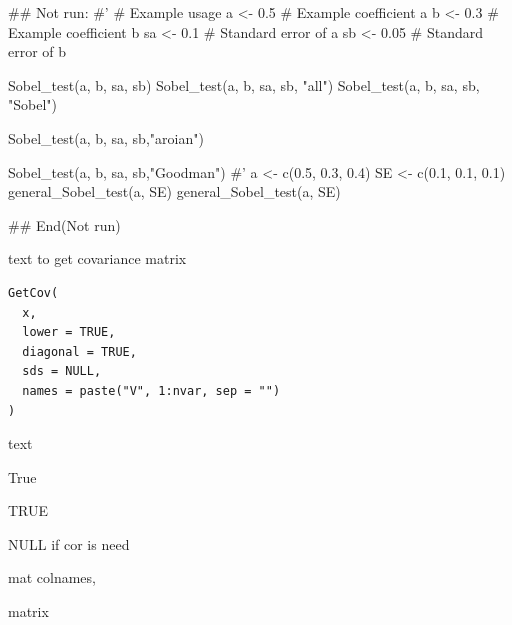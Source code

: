\documentclass[a4paper]{book}
\begin{document}
%
\begin{Examples}
\begin{ExampleCode}

## Not run: 
#'
# Example usage
a <- 0.5  # Example coefficient a
b <- 0.3  # Example coefficient b
sa <- 0.1 # Standard error of a
sb <- 0.05 # Standard error of b

Sobel_test(a, b, sa, sb)
Sobel_test(a, b, sa, sb, "all")
Sobel_test(a, b, sa, sb, "Sobel")

Sobel_test(a, b, sa, sb,"aroian")

Sobel_test(a, b, sa, sb,"Goodman")
#'
a <- c(0.5, 0.3, 0.4)
SE <- c(0.1, 0.1, 0.1)
general_Sobel_test(a, SE)
general_Sobel_test(a, SE)%



## End(Not run)
\end{ExampleCode}
\end{Examples}
%
\begin{Description}
text to get covariance matrix
\end{Description}
%
\begin{Usage}
\begin{verbatim}
GetCov(
  x,
  lower = TRUE,
  diagonal = TRUE,
  sds = NULL,
  names = paste("V", 1:nvar, sep = "")
)
\end{verbatim}
\end{Usage}
%
\begin{Arguments}
\begin{ldescription}
\item[\code{x}] text

\item[\code{lower}] True

\item[\code{diagonal}] TRUE

\item[\code{sds}] NULL if cor is need

\item[\code{names}] mat colnames,
\end{ldescription}
\end{Arguments}
%
\begin{Value}
matrix
\end{Value}
%
\end{document}
